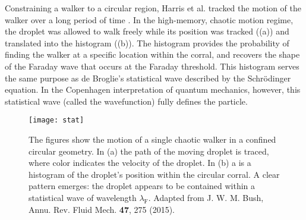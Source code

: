 





Constraining a walker to a circular region, Harris et al. tracked the motion of the walker over a long period of time \cite{Harris2013}. In the high-memory, chaotic motion regime, the droplet was allowed to walk freely while its position was tracked ((a)) and translated into the histogram ((b)). The histogram provides the probability of finding the walker at a specific location within the corral, and recovers the shape of the Faraday wave that occurs at the Faraday threshold. This histogram serves the same purpose as de Broglie's statistical wave described by the Schr\"{o}dinger equation. In the Copenhagen interpretation of quantum mechanics, however, this statistical wave (called the wavefunction) fully defines the particle. 

\begin{figure}[h]
	       \centering
	    \texttt{[image: stat]}
	     \caption{ The figures show the motion of a single chaotic walker in a confined circular geometry. In (a) the path of the moving droplet is traced, where color indicates the velocity of the droplet. In (b) a is a histogram of the droplet's position within the circular corral. A clear pattern emerges: the droplet appears to be contained within a statistical wave of wavelength $\lambda_\mathrm{F}$. Adapted from J. W. M. Bush, Annu. Rev. Fluid Mech. \textbf{47}, 275 (2015).
	     }
	 \label{stat}
	\end{figure}



